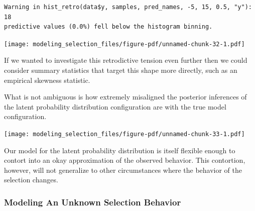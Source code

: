 \documentclass[
  letterpaper,
  DIV=11,
  numbers=noendperiod]{scrartcl}
\newenvironment{Shaded}{\begin{snugshade}}{\end{snugshade}}
\newcommand{\AttributeTok}[1]{\textcolor[rgb]{0.40,0.45,0.13}{#1}}
\newcommand{\DecValTok}[1]{\textcolor[rgb]{0.68,0.00,0.00}{#1}}
\newcommand{\FunctionTok}[1]{\textcolor[rgb]{0.28,0.35,0.67}{#1}}
\newcommand{\NormalTok}[1]{\textcolor[rgb]{0.00,0.23,0.31}{#1}}
\newcommand{\SpecialCharTok}[1]{\textcolor[rgb]{0.37,0.37,0.37}{#1}}
\newcommand{\StringTok}[1]{\textcolor[rgb]{0.13,0.47,0.30}{#1}}
\begin{document}
\begin{verbatim}
Warning in hist_retro(data$y, samples, pred_names, -5, 15, 0.5, "y"): 18
predictive values (0.0%) fell below the histogram binning.
\end{verbatim}

\texttt{[image: modeling\_selection\_files/figure-pdf/unnamed-chunk-32-1.pdf]}

If we wanted to investigate this retrodictive tension even further then
we could consider summary statistics that target this shape more
directly, such as an empirical skewness statistic.

What is not ambiguous is how extremely misaligned the posterior
inferences of the latent probability distribution configuration are with
the true model configuration.

\begin{Shaded}
\end{Shaded}

\texttt{[image: modeling\_selection\_files/figure-pdf/unnamed-chunk-33-1.pdf]}

Our model for the latent probability distribution is itself flexible
enough to contort into an okay approximation of the observed behavior.
This contortion, however, will not generalize to other circumstances
where the behavior of the selection changes.

\subsubsection{Modeling An Unknown Selection
Behavior}\label{modeling-an-unknown-selection-behavior}
\end{document}
